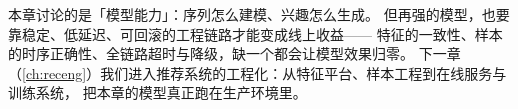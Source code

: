 本章讨论的是「模型能力」：序列怎么建模、兴趣怎么生成。
但再强的模型，也要靠稳定、低延迟、可回滚的工程链路才能变成线上收益——
特征的一致性、样本的时序正确性、全链路超时与降级，缺一个都会让模型效果归零。
下一章（\cref{ch:receng}）我们进入推荐系统的工程化：从特征平台、样本工程到在线服务与训练系统，
把本章的模型真正跑在生产环境里。
